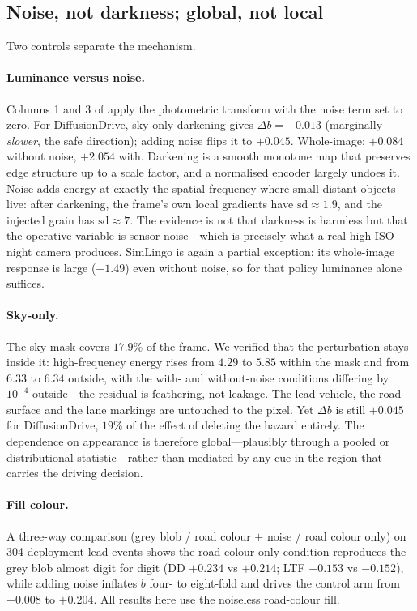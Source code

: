 \subsection{Noise, not darkness; global, not local}
\label{sec:controls}

Two controls separate the mechanism.

\paragraph{Luminance versus noise.} Columns 1 and 3 of  apply the photometric
transform with the noise term set to zero. For DiffusionDrive, sky-only darkening gives
$\Delta b = -0.013$ (marginally \emph{slower}, the safe direction); adding noise flips it to
$+0.045$. Whole-image: $+0.084$ without noise, $+2.054$ with. Darkening is a smooth monotone
map that preserves edge structure up to a scale factor, and a normalised encoder largely undoes
it. Noise adds energy at exactly the spatial frequency where small distant objects live: after
darkening, the frame's own local gradients have $\mathrm{sd}\approx 1.9$, and the injected grain
has $\mathrm{sd}\approx 7$. The evidence is not that darkness is harmless but that the operative
variable is sensor noise---which is precisely what a real high-ISO night camera produces.
SimLingo is again a partial exception: its whole-image response is large ($+1.49$) even without
noise, so for that policy luminance alone suffices.

\paragraph{Sky-only.} The sky mask covers $17.9\%$ of the frame. We verified that the
perturbation stays inside it: high-frequency energy rises from $4.29$ to $5.85$ within the mask
and from $6.33$ to $6.34$ outside, with the with- and without-noise conditions differing by
$10^{-4}$ outside---the residual is feathering, not leakage. The lead vehicle, the road surface
and the lane markings are untouched to the pixel. Yet $\Delta b$ is still $+0.045$ for
DiffusionDrive, $19\%$ of the effect of deleting the hazard entirely. The dependence on
appearance is therefore global---plausibly through a pooled or distributional statistic---rather
than mediated by any cue in the region that carries the driving decision.

\paragraph{Fill colour.} A three-way comparison (grey blob / road colour $+$ noise / road colour
only) on 304 deployment lead events shows the road-colour-only condition reproduces the grey
blob almost digit for digit (DD $+0.234$ vs $+0.214$; LTF $-0.153$ vs $-0.152$), while adding
noise inflates $b$ four- to eight-fold and drives the control arm from $-0.008$ to $+0.204$.
All results here use the noiseless road-colour fill.

